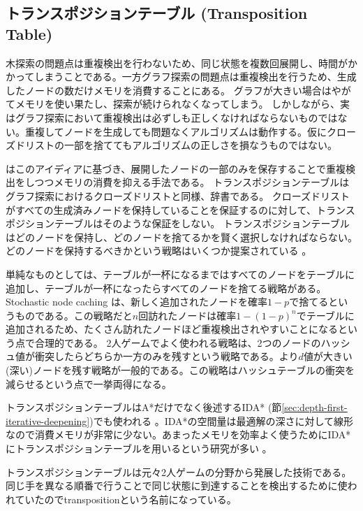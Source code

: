 \subsection{トランスポジションテーブル (Transposition Table)}

木探索の問題点は重複検出を行わないため、同じ状態を複数回展開し、時間がかかってしまうことである。一方グラフ探索の問題点は重複検出を行うため、生成したノードの数だけメモリを消費することにある。
グラフが大きい場合はやがてメモリを使い果たし、探索が続けられなくなってしまう。
しかしながら、実はグラフ探索において重複検出は必ずしも正しくなければならないものではない。重複してノードを生成しても問題なくアルゴリズムは動作する。仮にクローズドリストの一部を捨ててもアルゴリズムの正しさを損なうものではない。

はこのアイディアに基づき、展開したノードの一部のみを保存することで重複検出をしつつメモリの消費を抑える手法である。
トランスポジションテーブルはグラフ探索におけるクローズドリストと同様、辞書である。
クローズドリストがすべての生成済みノードを保持していることを保証するのに対して、トランスポジションテーブルはそのような保証をしない。
トランスポジションテーブルはどのノードを保持し、どのノードを捨てるかを賢く選択しなければならない。どのノードを保持するべきかという戦略はいくつか提案されている \cite{breuker1994replacement,akagi2010transposition}。

単純なものとしては、テーブルが一杯になるまではすべてのノードをテーブルに追加し、テーブルが一杯になったらすべてのノードを捨てる戦略がある。
Stochastic node caching \cite{miura1999stochastic}は、新しく追加されたノードを確率$1-p$で捨てるというものである。この戦略だと$n$回訪れたノードは確率$1- (1-p)^n$でテーブルに追加されるため、たくさん訪れたノードほど重複検出されやすいことになるという点で合理的である。
2人ゲームでよく使われる戦略は、2つのノードのハッシュ値が衝突したらどちらか一方のみを残すという戦略である。より$d$値が大きい(深い)ノードを残す戦略が一般的である。この戦略はハッシュテーブルの衝突を減らせるという点で一挙両得になる。

トランスポジションテーブルはA*だけでなく後述するIDA* (節\ref{sec:depth-first-iterative-deepening})でも使われる \cite{reinefeld1994enhanced}。IDA*の空間量は最適解の深さに対して線形なので消費メモリが非常に少ない。あまったメモリを効率よく使うためにIDA*にトランスポジションテーブルを用いるという研究が多い \cite{reinefeld1994enhanced,akagi2010transposition,kishimoto:02}。

トランスポジションテーブルは元々2人ゲームの分野から発展した技術である。同じ手を異なる順番で行うことで同じ状態に到達することを検出するために使われていたのでtranspositionという名前になっている。


